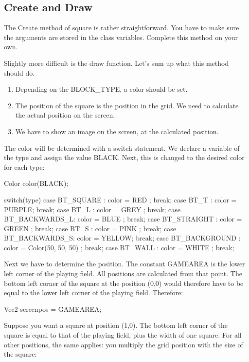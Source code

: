 \subsection{Create and Draw}
The Create method of square is rather straightforward. You have to make sure the arguments are stored in the class variables. Complete this method on your own.

Slightly more difficult is the draw function. Let's sum up what this method should do.

\begin{enumerate}
  \item Depending on the BLOCK\_TYPE, a color should be set. 
	\item The position of the square is the position in the grid. We need to calculate the actual position on the screen.
	\item We have to show an image on the screen, at the calculated position.
\end{enumerate}

The color will be determined with a switch statement. We declare a variable of the type  and assign the value BLACK. Next, this is changed to the desired color for each type:

\begin{code}
Color color(BLACK);
      
switch(type)
{
	 case BT_SQUARE     : color = RED   ; break;
	 case BT_T          : color = PURPLE; break;
	 case BT_L          : color = GREY  ; break;
	 case BT_BACKWARDS_L: color = BLUE  ; break;
	 case BT_STRAIGHT   : color = GREEN ; break;
	 case BT_S          : color = PINK  ; break;
	 case BT_BACKWARDS_S: color = YELLOW; break;
	 case BT_BACKGROUND : color = Color(50, 50, 50) ; break;
	 case BT_WALL       : color = WHITE ; break;
}
\end{code}

Next we have to determine the position. The constant GAMEAREA is the lower left corner of the playing field. All positions are calculated from that point. The bottom left corner of the square at the position (0,0) would therefore have to be equal to the lower left corner of the playing field. Therefore:

\begin{code}
Vec2 screenpos = GAMEAREA;
\end{code}

Suppose you want a square at position (1,0). The bottom left corner of the square is equal to that of the playing field, plus the width of one square. For all other positions, the same applies: you multiply the grid position with the size of the square:

